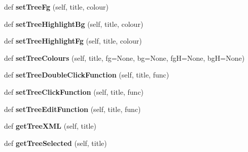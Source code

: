 \begin{DoxyCompactItemize}
\item 
\mbox{\label{class_python_01_g_u_i_1_1appjar_1_1gui_a924fa55b57b0a0dfd0253d508e6afffd}} 
def {\bfseries set\+Tree\+Fg} (self, title, colour)
\item 
\mbox{\label{class_python_01_g_u_i_1_1appjar_1_1gui_afa6881e1b3a9b55b5f7cb1f91dc7db4a}} 
def {\bfseries set\+Tree\+Highlight\+Bg} (self, title, colour)
\item 
\mbox{\label{class_python_01_g_u_i_1_1appjar_1_1gui_ad21f98d569a3174dc48d0004642ab133}} 
def {\bfseries set\+Tree\+Highlight\+Fg} (self, title, colour)
\item 
\mbox{\label{class_python_01_g_u_i_1_1appjar_1_1gui_ade793e82643d2a41fa0119573b1d59e1}} 
def {\bfseries set\+Tree\+Colours} (self, title, fg=None, bg=None, fgH=None, bgH=None)
\item 
\mbox{\label{class_python_01_g_u_i_1_1appjar_1_1gui_a0900149af69774ee1a9468ffdb47f0c2}} 
def {\bfseries set\+Tree\+Double\+Click\+Function} (self, title, func)
\item 
\mbox{\label{class_python_01_g_u_i_1_1appjar_1_1gui_a0a4d50c25670c19cfdab0e1b82e00a6c}} 
def {\bfseries set\+Tree\+Click\+Function} (self, title, func)
\item 
\mbox{\label{class_python_01_g_u_i_1_1appjar_1_1gui_a629d5f6ba310d693c93a454f67125d7b}} 
def {\bfseries set\+Tree\+Edit\+Function} (self, title, func)
\item 
\mbox{\label{class_python_01_g_u_i_1_1appjar_1_1gui_a311114e830070d77085207bba16b091c}} 
def {\bfseries get\+Tree\+X\+ML} (self, title)
\item 
\mbox{\label{class_python_01_g_u_i_1_1appjar_1_1gui_a37286e3ef9195fb9712c44c0aa6c22e2}} 
def {\bfseries get\+Tree\+Selected} (self, title)
\item 

\end{DoxyCompactItemize}

